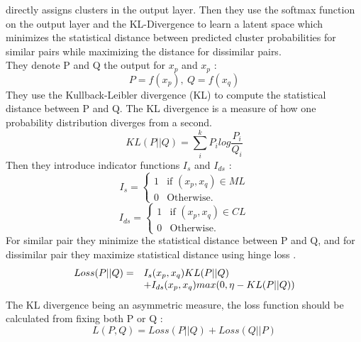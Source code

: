 directly assigns clusters in the output layer. Then they use the softmax 
function on the output layer and the KL-Divergence to learn a latent space 
which minimizes the statistical distance between predicted cluster probabilities 
for similar pairs while maximizing the distance for dissimilar pairs.\\
They denote P and Q the output for $x_p$ and $x_p$ : 
\begin{equation}
  P = f(x_p), ~ Q = f(x_q)
\end{equation}
They use the Kullback-Leibler divergence (KL) \cite{kullback1951} to compute the
statistical distance between P and Q. The KL divergence is a measure of how one 
probability distribution diverges from a second.
\begin{equation}
  KL(P||Q) = \sum\limits_i^k P_ilog\frac{P_i}{Q_i}
\end{equation}
Then they introduce indicator functions $I_s$ and $I_{ds}$ :  
\begin{equation}
  I_s = \left\{
\begin{array}{ll}
  1 & \mbox{if $(x_p, x_q) \in ML$}\\
  0 & \mbox{Otherwise.}
\end{array}
\right.
\end{equation}
%
\begin{equation}
  I_{ds} = \left\{
\begin{array}{ll}
  1 & \mbox{if $(x_p, x_q) \in CL$}\\
  0 & \mbox{Otherwise.}
\end{array}
\right.
\end{equation}
For similar pair they minimize the statistical distance between P and Q, and for
dissimilar pair they maximize statistical distance using hinge loss 
\cite{doi:10.1162/089976604773135104}.
\begin{equation}
\begin{array}{l l}
  Loss(P || Q) = & I_s(x_p, x_q)KL(P || Q) \\ 
                 & + I_{ds}(x_p, x_q)max(0,\eta-KL(P||Q))
\end{array}
\end{equation}
The KL divergence being an asymmetric measure, the loss function should be 
calculated from fixing both P or Q :
\begin{equation}
  L(P,Q) = Loss(P || Q) + Loss(Q || P)
\end{equation}

